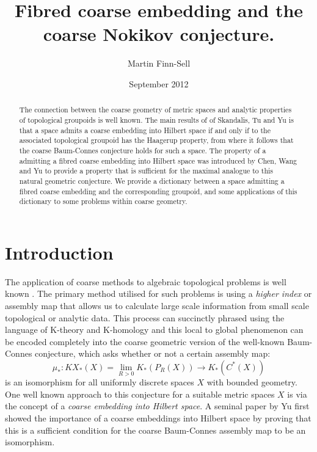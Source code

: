 \documentclass[11pt]{amsart}
\title{Fibred coarse embedding and the coarse Nokikov conjecture.}
\date{September 2012}
\author{Martin Finn-Sell}
\theoremstyle{plain}
\theoremstyle{definition}%
\theoremstyle{remark}%
\begin{document}

\maketitle
\begin{abstract}
The connection between the coarse geometry of metric spaces and analytic properties of topological groupoids is well known. The main results of of Skandalis, Tu and Yu is that a space admits a coarse embedding into Hilbert space if and only if to the associated topological groupoid has the Haagerup property, from where it follows that the coarse Baum-Connes conjecture holds for such a space. The property of a admitting a fibred coarse embedding into Hilbert space was introduced by Chen, Wang and Yu to provide a property that is sufficient for the maximal analogue to this natural geometric conjecture. We provide a dictionary between a space admitting a fibred coarse embedding and the corresponding groupoid, and some applications of this dictionary to some problems within coarse geometry.
\end{abstract}

\section{Introduction}

The application of coarse methods to algebraic topological problems is well known \cite{MR866507,MR1728880}. The primary method utilised for such problems is using a \textit{higher index} or assembly map that allows us to calculate large scale information from small scale topological or analytic data. This process can succinctly phrased using the language of K-theory and K-homology and this local to global phenomenon can be encoded completely into the coarse geometric version of the well-known Baum-Connes conjecture, which asks whether or not a certain assembly map:
\begin{equation*}
\mu_{*}:KX_{*}(X)=\lim_{R>0}K_{*}(P_{R}(X)) \longrightarrow K_{*}(C^{*}(X))
\end{equation*}
is an isomorphism for all uniformly discrete spaces $X$ with bounded geometry. One well known approach to this conjecture for a suitable metric spaces $X$ is via the concept of a \textit{coarse embedding into Hilbert space}. A seminal paper by Yu \cite{MR1728880} first showed the importance of a coarse embeddings into Hilbert space by proving that this is a sufficient condition for the coarse Baum-Connes assembly map to be an isomorphism.
\end{document}
